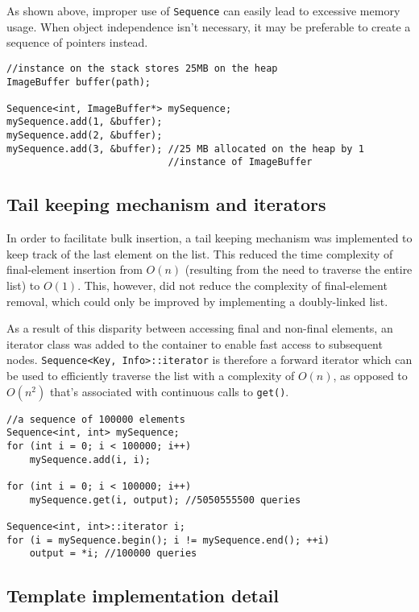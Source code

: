 ﻿\documentclass{article}
\begin{document}
As shown above, improper use of {\tt Sequence} can easily lead to excessive
memory usage. When object independence isn't necessary, it may be preferable
to create a sequence of pointers instead.

\begin{verbatim}
//instance on the stack stores 25MB on the heap
ImageBuffer buffer(path);

Sequence<int, ImageBuffer*> mySequence;
mySequence.add(1, &buffer);
mySequence.add(2, &buffer);
mySequence.add(3, &buffer); //25 MB allocated on the heap by 1
                            //instance of ImageBuffer
\end{verbatim}

\subsection{Tail keeping mechanism and iterators}

In order to facilitate bulk insertion, a tail keeping mechanism was implemented
to keep track of the last element on the list. This reduced the time complexity
of final-element insertion from $O(n)$ (resulting from the need to traverse the
entire list) to $O(1)$. This, however, did not reduce the complexity of
final-element removal, which could only be improved by implementing a
doubly-linked list.

As a result of this disparity between accessing final and non-final elements,
an iterator class was added to the container to enable fast access to subsequent
nodes. {\tt Sequence<Key, Info>::iterator} is therefore a forward iterator
which can be used to efficiently traverse the list with a complexity of $O(n)$,
as opposed to $O(n^2)$ that's associated with continuous calls to {\tt get()}.

\begin{verbatim}
//a sequence of 100000 elements
Sequence<int, int> mySequence;
for (int i = 0; i < 100000; i++)
    mySequence.add(i, i);

for (int i = 0; i < 100000; i++)
    mySequence.get(i, output); //5050555500 queries

Sequence<int, int>::iterator i;
for (i = mySequence.begin(); i != mySequence.end(); ++i)
    output = *i; //100000 queries
\end{verbatim}

\subsection{Template implementation detail}
\end{document}
